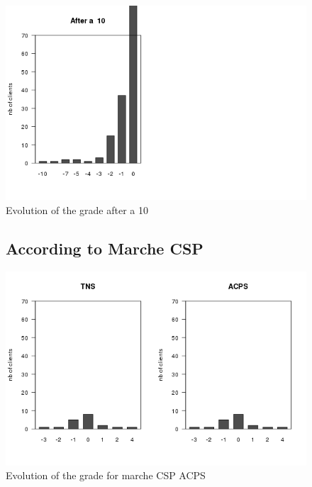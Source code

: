 \documentclass[a4paper, 11pt]{article}
\begin{document}
    \begin{figure}[!ht]
            \centering
            \includegraphics[height = 10 cm]{Remi/Evolution_of_the_grade_after_a_10.png}
            \caption{Evolution of the grade after a 10}
            \label{fig:e_10}
    \end{figure}

    \begin{figure}[!ht]
			\subsection{According to Marche CSP}
            \centering
            \includegraphics[height = 10 cm]{Remi/Evolution_of_the_grade_for_marche_CSP_ACPS.png}
            \caption{Evolution of the grade for marche CSP ACPS}
            \label{fig:e_CSP_ACPS}
    \end{figure}
\end{document}
